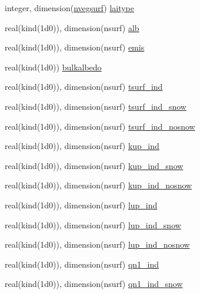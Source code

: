 \begin{DoxyCompactItemize}
\item 
integer, dimension(\hyperlink{namespaceallocatearray_abb987c3b35dd321963fd53d38f10236f}{nvegsurf}) \hyperlink{namespaceallocatearray_a6f2feef0f1dc416e159eaa33bf07019e}{laitype}
\item 
real(kind(1d0)), dimension(nsurf) \hyperlink{namespaceallocatearray_ad49963261e823b38b1d9e6dad29978bd}{alb}
\item 
real(kind(1d0)), dimension(nsurf) \hyperlink{namespaceallocatearray_a5780572b4c9bdc7bbf20e4ee9d72010e}{emis}
\item 
real(kind(1d0)) \hyperlink{namespaceallocatearray_a7ded7a35772c822d536989835435a474}{bulkalbedo}
\item 
real(kind(1d0)), dimension(nsurf) \hyperlink{namespaceallocatearray_a8ff59bff050fb421cbb0626422a102c6}{tsurf\+\_\+ind}
\item 
real(kind(1d0)), dimension(nsurf) \hyperlink{namespaceallocatearray_a7594c0064ddb78e02668b1562fc0a06d}{tsurf\+\_\+ind\+\_\+snow}
\item 
real(kind(1d0)), dimension(nsurf) \hyperlink{namespaceallocatearray_a18f9679fabfeae9ce40c8f9778d6fa0f}{tsurf\+\_\+ind\+\_\+nosnow}
\item 
real(kind(1d0)), dimension(nsurf) \hyperlink{namespaceallocatearray_ad56cceda5c3f4f010df2d55ce5a8e031}{kup\+\_\+ind}
\item 
real(kind(1d0)), dimension(nsurf) \hyperlink{namespaceallocatearray_a853e1d6db3b8879d2d7657e6e2df0685}{kup\+\_\+ind\+\_\+snow}
\item 
real(kind(1d0)), dimension(nsurf) \hyperlink{namespaceallocatearray_a83fb7e3559abcc7dbd5eb41bea6b25d0}{kup\+\_\+ind\+\_\+nosnow}
\item 
real(kind(1d0)), dimension(nsurf) \hyperlink{namespaceallocatearray_abe02f0b83f99a74be1c1133b86872599}{lup\+\_\+ind}
\item 
real(kind(1d0)), dimension(nsurf) \hyperlink{namespaceallocatearray_ac854cc7121610eee303aafda55092b55}{lup\+\_\+ind\+\_\+snow}
\item 
real(kind(1d0)), dimension(nsurf) \hyperlink{namespaceallocatearray_a99b72c6fb88f3204dc332f38601a92fb}{lup\+\_\+ind\+\_\+nosnow}
\item 
real(kind(1d0)), dimension(nsurf) \hyperlink{namespaceallocatearray_ae1c8dcf595053e7c0c88f68acf975058}{qn1\+\_\+ind}
\item 
real(kind(1d0)), dimension(nsurf) \hyperlink{namespaceallocatearray_aa0f581ad59f5d12178c78ed717aa0cdf}{qn1\+\_\+ind\+\_\+snow}
\item 

\end{DoxyCompactItemize}
